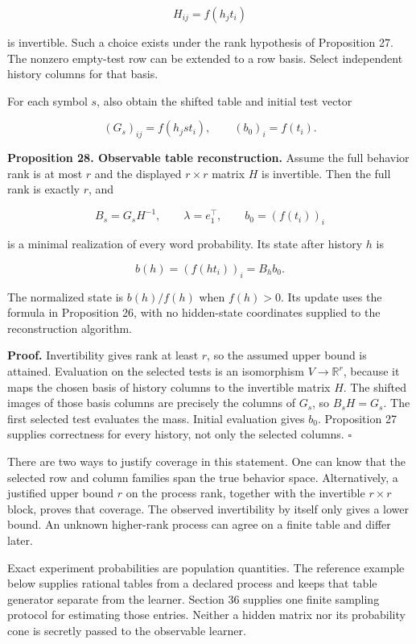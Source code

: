\documentclass[11pt,letterpaper]{article}
\begin{document}
\[
H_{ij}=f(h_jt_i)
\]

is invertible. Such a choice exists under the rank hypothesis of
Proposition 27. The nonzero empty-test row can be extended to a row
basis. Select independent history columns for that basis.

For each symbol \(s\), also obtain the shifted table and initial test
vector

\[
(G_s)_{ij}=f(h_jst_i),\qquad (b_0)_i=f(t_i).
\]

\textbf{Proposition 28. Observable table reconstruction.} Assume the
full behavior rank is at most \(r\) and the displayed \(r\times r\)
matrix \(H\) is invertible. Then the full rank is exactly \(r\), and

\[
\boxed{B_s=G_sH^{-1},\qquad \lambda=e_1^\top,\qquad b_0=(f(t_i))_i}
\]

is a minimal realization of every word probability. Its state after
history \(h\) is

\[
b(h)=(f(ht_i))_i=B_hb_0.
\]

The normalized state is \(b(h)/f(h)\) when \(f(h)>0\). Its update uses
the formula in Proposition 26, with no hidden-state coordinates supplied
to the reconstruction algorithm.

\textbf{Proof.} Invertibility gives rank at least \(r\), so the assumed
upper bound is attained. Evaluation on the selected tests is an
isomorphism \(V\to\mathbb R^r\), because it maps the chosen basis of
history columns to the invertible matrix \(H\). The shifted images of
those basis columns are precisely the columns of \(G_s\), so
\(B_sH=G_s\). The first selected test evaluates the mass. Initial
evaluation gives \(b_0\). Proposition 27 supplies correctness for every
history, not only the selected columns. \(\square\)

There are two ways to justify coverage in this statement. One can know
that the selected row and column families span the true behavior space.
Alternatively, a justified upper bound \(r\) on the process rank,
together with the invertible \(r\times r\) block, proves that coverage.
The observed invertibility by itself only gives a lower bound. An
unknown higher-rank process can agree on a finite table and differ
later.

Exact experiment probabilities are population quantities. The reference
example below supplies rational tables from a declared process and keeps
that table generator separate from the learner. Section 36 supplies one
finite sampling protocol for estimating those entries. Neither a hidden
matrix nor its probability cone is secretly passed to the observable
learner.
\end{document}
